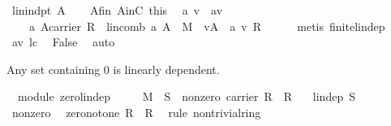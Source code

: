 \begin{isabellebody}
\ {\isachardoublequoteopen}{\isasymnot}lin{\isacharunderscore}indpt\ A{\isachardoublequoteclose}\isanewline
\ \ \isamarkupfalse%
\ A{\isacharunderscore}fin\ AinC\ this\ \isamarkupfalse%
\ a\ v\ \ av{\isacharcolon}\isanewline
\ \ \ \ {\isachardoublequoteopen}{\isacharparenleft}a{\isasymin}\ {\isacharparenleft}A{\isasymrightarrow}carrier\ R{\isacharparenright}{\isacharparenright}\ {\isasymand}\ {\isacharparenleft}lincomb\ a\ A\ {\isacharequal}\ {\isasymzero}\isactrlbsub M\isactrlesub {\isacharparenright}\ {\isasymand}\ {\isacharparenleft}v{\isasymin}A{\isacharparenright}\ {\isasymand}\ {\isacharparenleft}a\ v{\isasymnoteq}\ {\isasymzero}\isactrlbsub R\isactrlesub {\isacharparenright}{\isachardoublequoteclose}\isanewline
\ \ \ \ \isamarkupfalse%
\ {\isacharparenleft}metis\ finite{\isacharunderscore}lin{\isacharunderscore}dep{\isacharparenright}\isanewline
\ \ \isamarkupfalse%
\ av\ lc{}\ \isamarkupfalse%
\ False\ \isamarkupfalse%
\ auto\isanewline
{}\isamarkupfalse%
%
\endisatagproof
{\isafoldproof}%
%
\isadelimproof
%
\endisadelimproof
%
\begin{isamarkuptext}%
Any set containing 0 is linearly dependent.%
\end{isamarkuptext}%
\isamarkuptrue%
\isamarkupfalse%
\ {\isacharparenleft}\ module{\isacharparenright}\ zero{\isacharunderscore}lin{\isacharunderscore}dep{\isacharcolon}\ \isanewline
\ \ \ {}{\isacharcolon}\ {\isachardoublequoteopen}{\isasymzero}\isactrlbsub M\isactrlesub \ {\isasymin}\ S{\isachardoublequoteclose}\ \ nonzero{\isacharcolon}\ {\isachardoublequoteopen}carrier\ R\ {\isasymnoteq}\ {\isacharbraceleft}{\isasymzero}\isactrlbsub R\isactrlesub {\isacharbraceright}{\isachardoublequoteclose}\isanewline
\ \ \ {\isachardoublequoteopen}lin{\isacharunderscore}dep\ S{\isachardoublequoteclose}\isanewline
%
\isadelimproof
%
\endisadelimproof
%
\isatagproof
{}\isamarkupfalse%
\ {\isacharminus}\ \isanewline
\ \ \isamarkupfalse%
\ nonzero\ \isamarkupfalse%
\ zero{\isacharunderscore}not{\isacharunderscore}one{\isacharcolon}\ {\isachardoublequoteopen}{\isasymzero}\isactrlbsub R\isactrlesub \ {\isasymnoteq}\ {\isasymone}\isactrlbsub R\isactrlesub {\isachardoublequoteclose}\ \isamarkupfalse%
\ {\isacharparenleft}rule\ nontrivial{\isacharunderscore}ring{\isacharparenright}\isanewline

\end{isabellebody}
